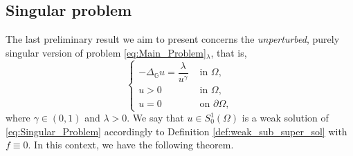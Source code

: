 \documentclass[11pt]{amsart}
\numberwithin{equation}{section} %
\theoremstyle{definition}
\begin{document}
\subsection{Singular problem}\label{subsec:Singular}
The last preliminary result
we aim to present concerns the 
\emph{un\-per\-tur\-bed}, purely singular version of problem \eqref{eq:Main_Problem}$_\lambda$, that is,
\begin{equation}\label{eq:Singular_Problem}
	\left\{\begin{array}{rl}
				-\Delta_{\mathbb{G}}u = \dfrac{\lambda}{u^{\gamma}} & \textrm{ in } \Omega,\\
				u>0 & \textrm{ in } \Omega,\\
				u=0 & \textrm{ on } \partial \Omega,
	\end{array}\right.
\end{equation}
\noindent where $\gamma \in (0,1)$ and $\lambda >0$. We say that $u \in S^{1}_{0}(\Omega)$ is a weak solution of \eqref{eq:Singular_Problem} accordingly to Definition \ref{def:weak_sub_super_sol} with $f \equiv 0$.
In this context, we have the following theorem.
\end{document}
